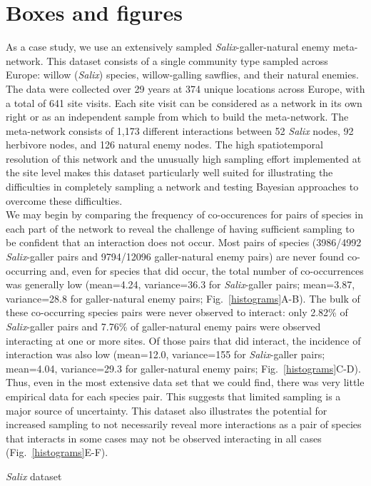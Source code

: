 \documentclass[12pt]{article}
\begin{document}
\section*{Boxes and figures}


\begin{floatbox}{}

    \indent As a case study, we use an extensively sampled \emph{Salix}-galler-natural enemy meta-network. This dataset consists of a single community type sampled across Europe: willow (\emph{Salix}) species, willow-galling sawflies, and their natural enemies. The data were collected over 29 years at 374 unique locations across Europe, with a total of 641 site visits. Each site visit can be considered as a network in its own right or as an independent sample from which to build the meta-network. The meta-network consists of 1,173 different interactions between 52 \emph{Salix} nodes, 92 herbivore nodes, and 126 natural enemy nodes. The high spatiotemporal resolution of this network and the unusually high sampling effort implemented at the site level makes this dataset particularly well suited for illustrating the difficulties in completely sampling a network and testing Bayesian approaches to overcome these difficulties.\\
    \indent We may begin by comparing the frequency of co-occurences for pairs of species in each part of the network to reveal the challenge of having sufficient sampling to be confident that an interaction does not occur. Most pairs of species (3986/4992 \emph{Salix}-galler pairs and  9794/12096 galler-natural enemy pairs) are never found co-occurring and, even for species that did occur, the total number of co-occurrences was generally low (mean=4.24, variance=36.3 for \emph{Salix}-galler pairs; mean=3.87, variance=28.8 for galler-natural enemy pairs; Fig.~\ref{histograms}A-B). The bulk of these co-occurring species pairs were never observed to interact: only 2.82\% of \emph{Salix}-galler pairs and 7.76\% of galler-natural enemy pairs were observed interacting at one or more sites. Of those pairs that did interact, the incidence of interaction was also low (mean=12.0, variance=155 for \emph{Salix}-galler pairs; mean=4.04, variance=29.3 for galler-natural enemy pairs; Fig.~\ref{histograms}C-D). Thus, even in the most extensive data set that we could find, there was very little empirical data for each species pair. This suggests that limited sampling is a major source of uncertainty. This dataset also illustrates the potential for increased sampling to not necessarily reveal more interactions as a pair of species that interacts in some cases may not be observed interacting in all cases (Fig.~\ref{histograms}E-F).
  \caption{\emph{Salix} dataset}
  \label{box1}
\end{floatbox}
\end{document}
